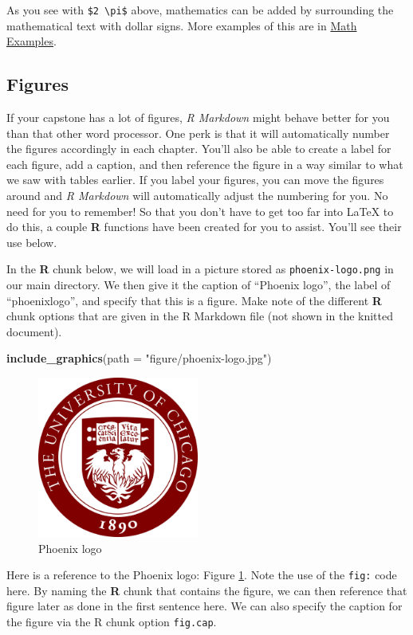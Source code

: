 \documentclass[12pt,oneside]{chicagocapstone}
\newenvironment{Shaded}{\begin{snugshade}}{\end{snugshade}}
\newcommand{\KeywordTok}[1]{\textcolor[rgb]{0.13,0.29,0.53}{\textbf{#1}}}
\newcommand{\DataTypeTok}[1]{\textcolor[rgb]{0.13,0.29,0.53}{#1}}
\newcommand{\StringTok}[1]{\textcolor[rgb]{0.31,0.60,0.02}{#1}}
\newcommand{\NormalTok}[1]{#1}
\begin{document}
As you see with \texttt{\$2\ \textbackslash{}pi\$} above, mathematics
can be added by surrounding the mathematical text with dollar signs.
More examples of this are in \protect\hyperlink{math-examples}{Math
Examples}.

\subsection*{Figures}\label{figures}

If your capstone has a lot of figures, \emph{R Markdown} might behave
better for you than that other word processor. One perk is that it will
automatically number the figures accordingly in each chapter. You'll
also be able to create a label for each figure, add a caption, and then
reference the figure in a way similar to what we saw with tables
earlier. If you label your figures, you can move the figures around and
\emph{R Markdown} will automatically adjust the numbering for you. No
need for you to remember! So that you don't have to get too far into
LaTeX to do this, a couple \textbf{R} functions have been created for
you to assist. You'll see their use below.

In the \textbf{R} chunk below, we will load in a picture stored as
\texttt{phoenix-logo.png} in our main directory. We then give it the
caption of ``Phoenix logo'', the label of ``phoenixlogo'', and specify
that this is a figure. Make note of the different \textbf{R} chunk
options that are given in the R Markdown file (not shown in the knitted
document).
\begin{Shaded}
\begin{Highlighting}[]
\KeywordTok{include_graphics}\NormalTok{(}\DataTypeTok{path =} \StringTok{"figure/phoenix-logo.jpg"}\NormalTok{)}
\end{Highlighting}
\end{Shaded}
\begin{figure}

{\centering \includegraphics[width=200px]{figure/phoenix-logo} 

}

\caption{Phoenix logo}\label{fig:phoenixlogo}
\end{figure}
Here is a reference to the Phoenix logo: Figure \ref{fig:phoenixlogo}.
Note the use of the \texttt{fig:} code here. By naming the \textbf{R}
chunk that contains the figure, we can then reference that figure later
as done in the first sentence here. We can also specify the caption for
the figure via the R chunk option \texttt{fig.cap}.
\end{document}
